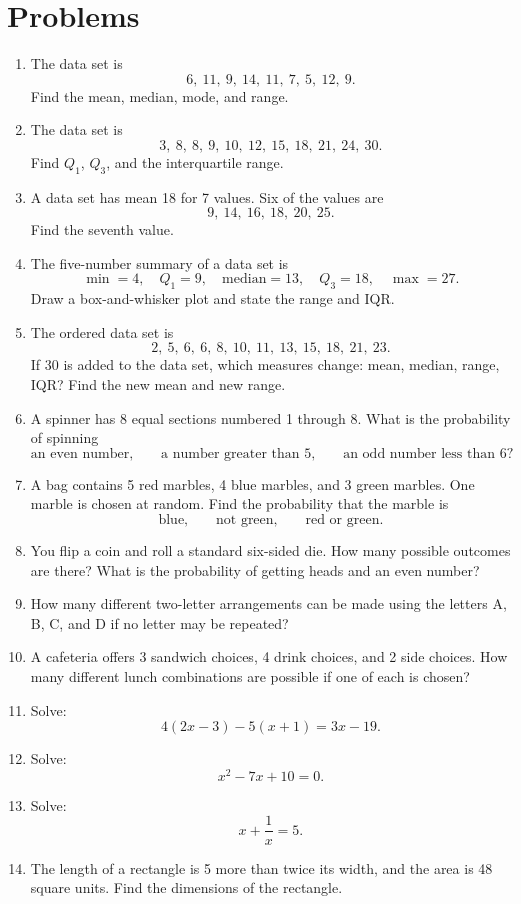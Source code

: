 \documentclass[12pt]{article}
\begin{document}
\section*{Problems}
\begin{enumerate}[leftmargin=*, itemsep=1em, topsep=0.8em]
  \item The data set is
  \[
  6,\ 11,\ 9,\ 14,\ 11,\ 7,\ 5,\ 12,\ 9.
  \]
  Find the mean, median, mode, and range.

  \item The data set is
  \[
  3,\ 8,\ 8,\ 9,\ 10,\ 12,\ 15,\ 18,\ 21,\ 24,\ 30.
  \]
  Find $Q_1$, $Q_3$, and the interquartile range.

  \item A data set has mean 18 for 7 values. Six of the values are
  \[
  9,\ 14,\ 16,\ 18,\ 20,\ 25.
  \]
  Find the seventh value.

  \item The five-number summary of a data set is
  \[
  \min=4,\quad Q_1=9,\quad \text{median}=13,\quad Q_3=18,\quad \max=27.
  \]
  Draw a box-and-whisker plot and state the range and IQR.

  \item The ordered data set is
  \[
  2,\ 5,\ 6,\ 6,\ 8,\ 10,\ 11,\ 13,\ 15,\ 18,\ 21,\ 23.
  \]
  If 30 is added to the data set, which measures change: mean, median, range, IQR? Find the new mean and new range.

  \item A spinner has 8 equal sections numbered 1 through 8. What is the probability of spinning
  \[
  \text{an even number,}\qquad
  \text{a number greater than 5,}\qquad
  \text{an odd number less than 6}?
  \]

  \item A bag contains 5 red marbles, 4 blue marbles, and 3 green marbles. One marble is chosen at random. Find the probability that the marble is
  \[
  \text{blue,}\qquad
  \text{not green,}\qquad
  \text{red or green}.
  \]

  \item You flip a coin and roll a standard six-sided die. How many possible outcomes are there? What is the probability of getting heads and an even number?

  \item How many different two-letter arrangements can be made using the letters A, B, C, and D if no letter may be repeated?

  \item A cafeteria offers 3 sandwich choices, 4 drink choices, and 2 side choices. How many different lunch combinations are possible if one of each is chosen?

  \item Solve:
  \[
  4(2x-3)-5(x+1)=3x-19.
  \]

  \item Solve:
  \[
  x^2-7x+10=0.
  \]

  \item Solve:
  \[
  x+\frac{1}{x}=5.
  \]

  \item The length of a rectangle is 5 more than twice its width, and the area is 48 square units. Find the dimensions of the rectangle.
\end{enumerate}
\end{document}
